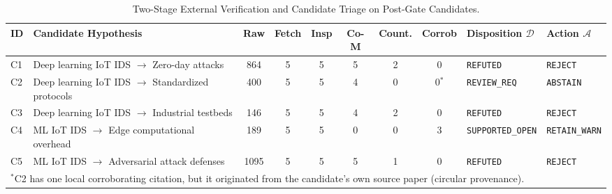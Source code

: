\documentclass[runningheads]{llncs}
\begin{document}
\begin{table}[htbp]
\centering
\caption{Two-Stage External Verification and Candidate Triage on Post-Gate Candidates.}
\label{tab:triage}
\scriptsize
\setlength{\tabcolsep}{2.0pt}
\begin{tabular}{p{0.5cm}p{2.6cm}ccccccp{1.7cm}p{1.3cm}}
\toprule
\textbf{ID} & \textbf{Candidate Hypothesis} & \textbf{Raw} & \textbf{Fetch} & \textbf{Insp} & \textbf{Co-M} & \textbf{Count.} & \textbf{Corrob} & \textbf{Disposition $\mathcal{D}$} & \textbf{Action $\mathcal{A}$} \\
\midrule
C1 & Deep learning IoT IDS $\rightarrow$ Zero-day attacks & 864 & 5 & 5 & 5 & 2 & 0 & \texttt{REFUTED} & \texttt{REJECT} \\
C2 & Deep learning IoT IDS $\rightarrow$ Standardized protocols & 400 & 5 & 5 & 4 & 0 & 0$^*$ & \texttt{REVIEW\_REQ} & \texttt{ABSTAIN} \\
C3 & Deep learning IoT IDS $\rightarrow$ Industrial testbeds & 146 & 5 & 5 & 4 & 2 & 0 & \texttt{REFUTED} & \texttt{REJECT} \\
C4 & ML IoT IDS $\rightarrow$ Edge computational overhead & 189 & 5 & 5 & 0 & 0 & 3 & \texttt{SUPPORTED\_}\allowbreak\texttt{OPEN} & \texttt{RETAIN\_}\allowbreak\texttt{WARN} \\
C5 & ML IoT IDS $\rightarrow$ Adversarial attack defenses & 1095 & 5 & 5 & 5 & 1 & 0 & \texttt{REFUTED} & \texttt{REJECT} \\
\bottomrule
\multicolumn{10}{p{11.5cm}}{\tiny $^*$C2 has one local corroborating citation, but it originated from the candidate's own source paper (circular provenance).}
\end{tabular}
\end{table}
\end{document}
